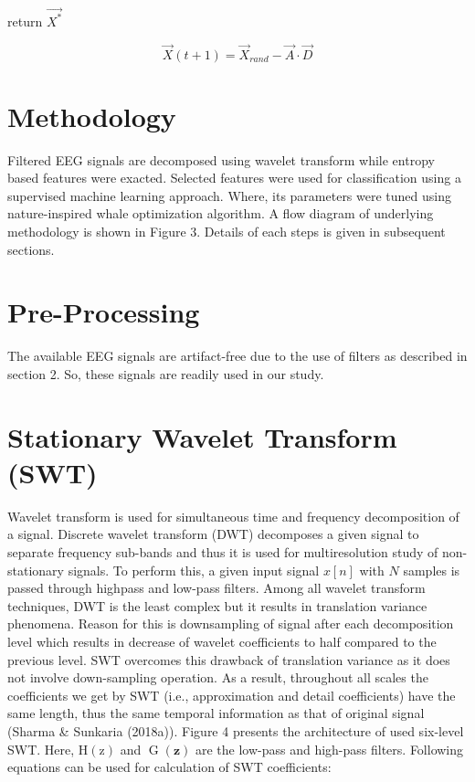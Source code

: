 \documentclass{article}
\begin{document}
return $\vec{X^{*}}$


\[
\vec{X}(t+1)=\vec{X}_{r a n d}-\vec{A}\cdot\vec{D}
\]


\section{Methodology}


Filtered EEG signals are decomposed using wavelet transform while entropy based features were exacted. Selected features were used for classification using a supervised machine learning approach. Where, its parameters were tuned using nature-inspired whale optimization algorithm. A flow diagram of underlying methodology is shown in Figure 3. Details of each steps is given in subsequent sections.


\section{Pre-Processing}


The available EEG signals are artifact-free due to the use of filters as described in section 2. So, these signals are readily used in our study.


\section{Stationary Wavelet Transform (SWT)}


Wavelet transform is used for simultaneous time and frequency decomposition of a signal. Discrete wavelet transform (DWT) decomposes a given signal to separate frequency sub-bands and thus it is used for multiresolution study of non-stationary signals. To perform this, a given input signal $x[n]$ with $N$ samples is passed through highpass and low-pass filters. Among all wavelet transform techniques, DWT is the least complex but it results in translation variance phenomena. Reason for this is downsampling of signal after each decomposition level which results in decrease of wavelet coefficients to half compared to the previous level. SWT overcomes this drawback of translation variance as it does not involve down-sampling operation. As a result, throughout all scales the coefficients we get by SWT (i.e., approximation and detail coefficients) have the same length, thus the same temporal information as that of original signal (Sharma & Sunkaria (2018a)). Figure 4 presents the architecture of used six-level SWT. Here, $\mathrm{H}(\mathrm{z})$ and $\operatorname{G}(\mathbf{z})$ are the low-pass and high-pass filters. Following equations can be used for calculation of SWT coefficients:
\end{document}

